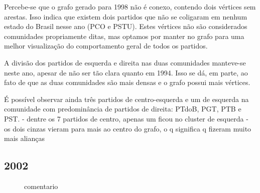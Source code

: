 Percebe-se que o grafo gerado para 1998 não é conexo, contendo dois vértices sem arestas. Isso indica que existem dois partidos que não se coligaram em nenhum estado do Brasil nesse ano (\gls{PCO} e \gls{PSTU}). Estes vértices não são considerados comunidades propriamente ditas, mas optamos por manter no grafo para uma melhor visualização do comportamento geral de todos os partidos.

A divisão dos partidos de esquerda e direita nas duas comunidades manteve-se neste ano, apesar de não ser tão clara quanto em 1994. Isso se dá, em parte, ao fato de que as duas comunidades são mais densas e o grafo possui mais vértices.

É possível observar ainda três partidos de centro-esquerda e um de esquerda na comunidade com predominância de partidos de direita: \gls{PTdoB}, \gls{PGT}, \gls{PTB} e \gls{PST}.
- dentre os 7 partidos de centro, apenas um ficou no cluster de esquerda
- os dois cinzas vieram para mais ao centro do grafo, o q significa q fizeram muito mais alianças

\subsection{2002}
\label{resultados__grafos--2002}

\begin{figure}[H]
\center
    \qquad

    \caption{comentario}
\end{figure}


